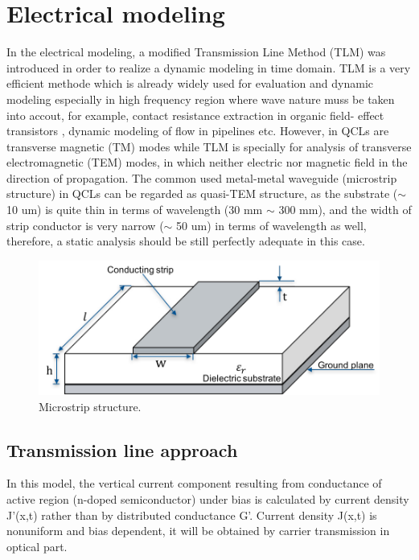 \documentclass[11pt,final]{scrbook}
\begin{document}
\section{Electrical modeling}
In the electrical modeling, a modified Transmission Line Method (TLM) was introduced in order to realize a dynamic modeling in time domain. TLM is a very efficient methode which is already widely used for evaluation and dynamic modeling especially in high frequency region where wave nature muss be taken into accout, for example, contact resistance extraction in organic field- effect transistors \cite{xu2010modified}, dynamic modeling of flow in pipelines \cite{johnston2014enhanced} etc. However, in QCLs are transverse magnetic (TM) modes \cite{yan2009directional} while TLM is specially for analysis of transverse electromagnetic (TEM) modes, in which neither electric nor magnetic field in the direction of propagation. The common used metal-metal waveguide (microstrip structure) in QCLs can be regarded as quasi-TEM structure, as the substrate ($ \sim $ 10 um) is quite thin in terms of wavelength (30 mm $ \sim $ 300 mm), and the width of strip conductor is very narrow ($ \sim $ 50 um) in terms of wavelength as well, therefore, a static analysis should be still perfectly adequate in this case.

\begin{figure}[htbp]
\begin{center}
\includegraphics[scale=0.8]{images/Microstrip.pdf}
\caption{Microstrip structure.}
\label{fig:Microstrip}
\end{center}
\end{figure}

\subsection{Transmission line approach}
In this model, the vertical current component resulting from conductance of active region (n-doped semiconductor) under bias is calculated by current density J'(x,t) rather than by distributed conductance G'. Current density J(x,t) is nonuniform and bias dependent, it will be obtained by carrier transmission in optical part. 
\end{document}
